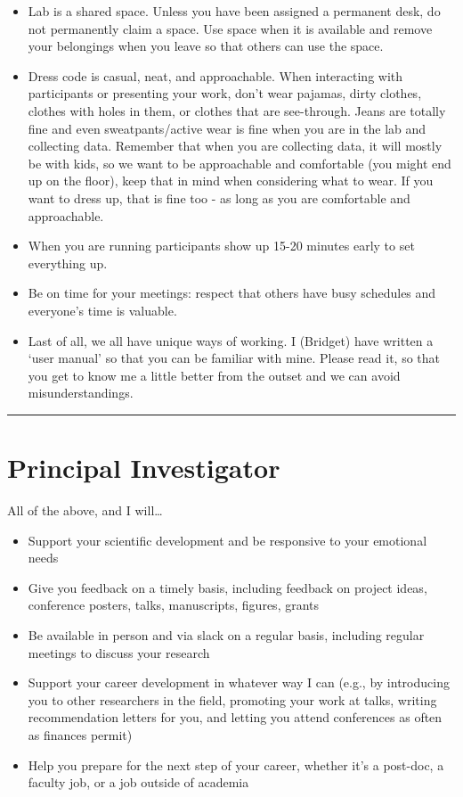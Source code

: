 \documentclass[]{book}
\providecommand{\tightlist}{%
  \setlength{\itemsep}{0pt}\setlength{\parskip}{0pt}}
\begin{document}
\begin{itemize}
\item
  Lab is a shared space. Unless you have been assigned a permanent desk, do not permanently claim a space. Use space when it is available and remove your belongings when you leave so that others can use the space.
\item
  Dress code is casual, neat, and approachable. When interacting with participants or presenting your work, don't wear pajamas, dirty clothes, clothes with holes in them, or clothes that are see-through. Jeans are totally fine and even sweatpants/active wear is fine when you are in the lab and collecting data. Remember that when you are collecting data, it will mostly be with kids, so we want to be approachable and comfortable (you might end up on the floor), keep that in mind when considering what to wear. If you want to dress up, that is fine too - as long as you are comfortable and approachable.
\item
  When you are running participants show up 15-20 minutes early to set everything up.
\item
  Be on time for your meetings: respect that others have busy schedules and everyone's time is valuable.
\item
  Last of all, we all have unique ways of working. I (Bridget) have written a `user manual' so that you can be familiar with mine. Please read it, so that you get to know me a little better from the outset and we can avoid misunderstandings.
\end{itemize}

\begin{center}\rule{0.5\linewidth}{0.5pt}\end{center}

\hypertarget{principal-investigator}{%
\section{Principal Investigator}\label{principal-investigator}}

All of the above, and I will\ldots{}

\begin{itemize}
\tightlist
\item
  Support your scientific development and be responsive to your emotional needs
\item
  Give you feedback on a timely basis, including feedback on project ideas, conference posters, talks, manuscripts, figures, grants
\item
  Be available in person and via slack on a regular basis, including regular meetings to discuss your research
\item
  Support your career development in whatever way I can (e.g., by introducing you to other researchers in the field, promoting your work at talks, writing recommendation letters for you, and letting you attend conferences as often as finances permit)
\item
  Help you prepare for the next step of your career, whether it's a post-doc, a faculty job, or a job outside of academia
\end{itemize}
\end{document}
